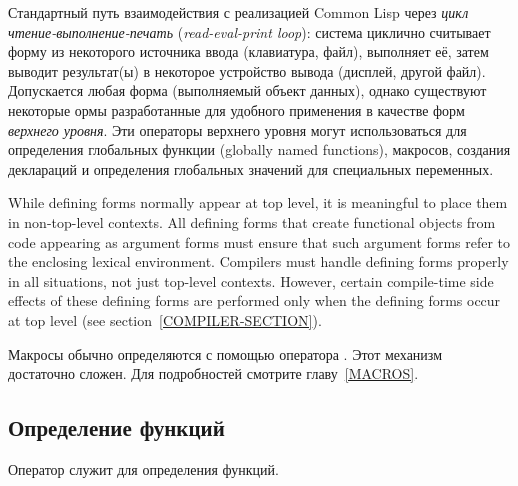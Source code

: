 Стандартный путь взаимодействия с реализацией Common Lisp через
\emph{цикл чтение-выполнение-печать} (\emph{read-eval-print loop}): система
циклично считывает форму из некоторого источника ввода (клавиатура, файл),
выполняет её, затем выводит результат(ы) в некоторое устройство вывода (дисплей,
другой файл). Допускается любая форма (выполняемый объект данных), однако
существуют некоторые ормы разработанные для удобного применения в качестве форм 
\emph{верхнего уровня}.
Эти операторы верхнего уровня могут использоваться для определения
глобальных функции (globally named functions), макросов, создания деклараций и
определения глобальных значений для специальных переменных.

While defining forms normally appear at top level,
it is meaningful to place them in non-top-level contexts.
All defining forms that create functional objects from code appearing
as argument forms must ensure that
such argument forms refer to the enclosing lexical environment.
Compilers must handle defining forms properly in all situations,
not just top-level contexts.  However, certain
compile-time side effects of these defining forms are performed only
when the defining forms occur at top level (see section~\ref{COMPILER-SECTION}).

Макросы обычно определяются с помощью оператора .
Этот механизм достаточно сложен. Для подробностей смотрите главу~\ref{MACROS}.

\subsection{Определение функций}

Оператор  служит для определения функций.

